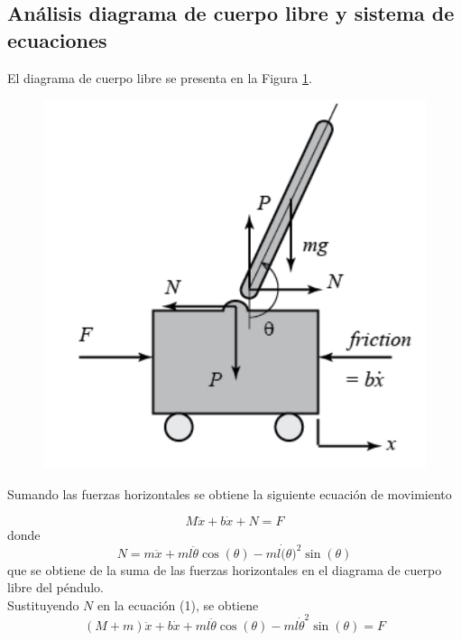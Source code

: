 \documentclass{ieeeaccess}
\begin{document}
\subsection{Análisis diagrama de cuerpo libre y sistema de ecuaciones}

El diagrama de cuerpo libre se presenta en la Figura \ref{cuerpo}.\\

\begin{figure}[h!]
\centering
\includegraphics[scale=0.5]{diagrama_cuerpo.PNG}
\label{cuerpo}
\end{figure}

Sumando las fuerzas horizontales se obtiene la siguiente ecuación de movimiento

\begin{equation}
\label{eq: motion}
M\ddot{x}+b\dot{x}+N = F
\end{equation}
donde $$N=m\ddot{x}+ml\ddot{\theta}\cos(\theta)-ml\dot(\theta)^2\sin(\theta)$$ que se obtiene de la suma de las fuerzas horizontales en el diagrama de cuerpo libre del péndulo.\\

Sustituyendo $N$ en la ecuación (1), se obtiene
\begin{equation}
\label{eq: motion1}
(M+m)\ddot{x}+b\dot{x}+ml\ddot{\theta}\cos(\theta)-ml\dot{\theta}^2\sin(\theta) = F
\end{equation}
\end{document}
